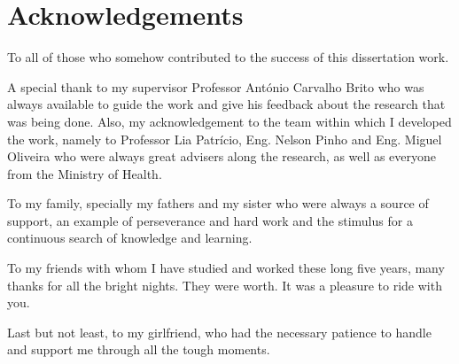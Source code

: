 \chapter*{Acknowledgements}

To all of those who somehow contributed to the success of this dissertation work.

A special thank to my supervisor Professor António Carvalho Brito who was always available to guide the work and give his feedback about the research that was being done. Also, my acknowledgement to the team within which I developed the work, namely to Professor Lia Patrício, Eng. Nelson Pinho and Eng. Miguel Oliveira who were always great advisers along the research, as well as everyone from the Ministry of Health.

To my family, specially my fathers and my sister who were always a source of support, an example of perseverance and hard work and the stimulus for a continuous search of knowledge and learning. 

To my friends with whom I have studied and worked these long five years, many thanks for all the bright nights. They were worth. It was a pleasure to ride with you.

Last but not least, to my girlfriend, who had the necessary patience to handle and support me through all the tough moments. 

\vspace{10mm}
